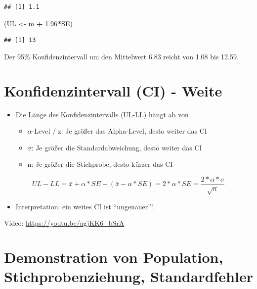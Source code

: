 \documentclass[
]{book}
\newenvironment{Shaded}{\begin{snugshade}}{\end{snugshade}}
\newcommand{\FloatTok}[1]{\textcolor[rgb]{0.00,0.00,0.81}{#1}}
\newcommand{\NormalTok}[1]{#1}
\newcommand{\OperatorTok}[1]{\textcolor[rgb]{0.81,0.36,0.00}{\textbf{#1}}}
\newcommand{\StringTok}[1]{\textcolor[rgb]{0.31,0.60,0.02}{#1}}
\providecommand{\tightlist}{%
  \setlength{\itemsep}{0pt}\setlength{\parskip}{0pt}}
\begin{document}
\begin{verbatim}
## [1] 1.1
\end{verbatim}

\begin{Shaded}
\begin{Highlighting}[]
\NormalTok{(UL <-}\StringTok{ }\NormalTok{m }\OperatorTok{+}\StringTok{ }\FloatTok{1.96}\OperatorTok{*}\NormalTok{SE)}
\end{Highlighting}
\end{Shaded}

\begin{verbatim}
## [1] 13
\end{verbatim}

Der 95\% Konfidenzintervall um den Mittelwert 6.83 reicht von 1.08 bis 12.59.

\hypertarget{konfidenzintervall-ci---weite}{%
\section{Konfidenzintervall (CI) - Weite}\label{konfidenzintervall-ci---weite}}

\begin{itemize}
\tightlist
\item
  Die Länge des Konfidenzintervalls (UL-LL) hängt ab von

  \begin{itemize}
  \tightlist
  \item
    \(\alpha\)-Level / z: Je größer das Alpha-Level, desto weiter das CI
  \item
    \(\sigma\): Je größer die Standardabweichung, desto weiter das CI
  \item
    n: Je größer die Stichprobe, desto kürzer das CI
  \end{itemize}
\end{itemize}

\[ UL - LL = \bar{x} + \alpha*SE -(\bar{x} - \alpha*SE) = 2*\alpha*SE = \frac{2*\alpha*\sigma}{\sqrt{n}} \]

\begin{itemize}
\tightlist
\item
  Interpretation: ein weites CI ist ``ungenauer''!
\end{itemize}

Video: \url{https://youtu.be/agjKK6_bSrA}

\hypertarget{demonstration-von-population-stichprobenziehung-standardfehler}{%
\section{Demonstration von Population, Stichprobenziehung, Standardfehler}\label{demonstration-von-population-stichprobenziehung-standardfehler}}
\end{document}
